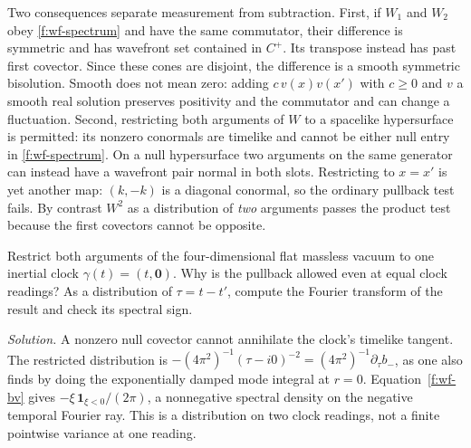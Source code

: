 \Needspace{.47\textheight}
Two consequences separate measurement from subtraction. First, if $W_1$
and $W_2$ obey \eqref{f:wf-spectrum} and have the same commutator, their
difference is symmetric and has wavefront set contained in $C^+$. Its
transpose instead has past first covector. Since these cones are disjoint,
the difference is a smooth symmetric bisolution. Smooth does not mean
zero: adding $c\,v(x)v(x')$ with $c\ge0$ and $v$ a smooth real solution
preserves positivity and the commutator and can change a fluctuation.
Second, restricting both arguments of $W$ to a spacelike hypersurface is
permitted: its nonzero conormals are timelike and cannot be either null
entry in \eqref{f:wf-spectrum}. On a null hypersurface two arguments on
the same generator can instead have a wavefront pair normal in both
slots. Restricting to $x=x'$ is yet another
map: $(k,-k)$ is a diagonal conormal, so the ordinary pullback test
fails. By contrast $W^2$ as a distribution of \emph{two} arguments passes
the product test because the first covectors cannot be opposite.

\begin{exercise}
Restrict both arguments of the four-dimensional flat massless vacuum to
one inertial clock $\gamma(t)=(t,\mathbf0)$. Why is the pullback allowed
even at equal clock readings? As a distribution of $\tau=t-t'$, compute
the Fourier transform of the result and check its spectral sign.
\end{exercise}
\noindent\emph{Solution.} A nonzero null covector cannot annihilate the
clock's timelike tangent. The restricted distribution is
$-(4\pi^2)^{-1}(\tau-i0)^{-2}=(4\pi^2)^{-1}\partial_\tau b_-$, as one
also finds by doing the exponentially damped mode integral at $r=0$.
Equation~\eqref{f:wf-bv} gives
$-\xi\,\mathbf 1_{\xi<0}/(2\pi)$, a nonnegative spectral density on the
negative temporal Fourier ray. This is a distribution on two clock
readings, not a finite pointwise variance at one reading.

